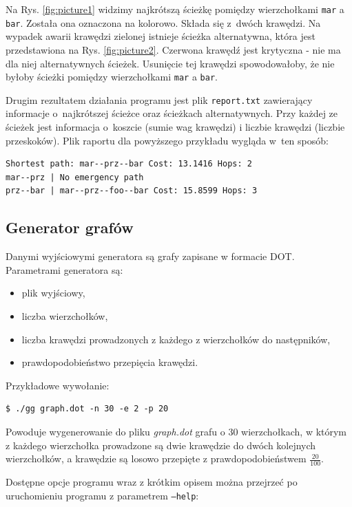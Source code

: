 \documentclass[a4paper, 12pt]{article}
\begin{document}
Na Rys. \ref{fig:picture1} widzimy najkrótszą ścieżkę pomiędzy wierzchołkami \texttt{mar} a \texttt{bar}. Została ona oznaczona na kolorowo. Składa się z~dwóch krawędzi. Na wypadek awarii krawędzi zielonej istnieje ścieżka alternatywna, która jest przedstawiona na Rys. \ref{fig:picture2}. Czerwona krawędź jest krytyczna - nie ma dla niej alternatywnych ścieżek. Usunięcie tej krawędzi spowodowałoby, że nie byłoby ścieżki pomiędzy wierzchołkami \texttt{mar} a \texttt{bar}.

Drugim rezultatem działania programu jest plik \texttt{report.txt} zawierający informacje o~najkrótszej ścieżce oraz ścieżkach alternatywnych. Przy każdej ze ścieżek jest informacja o~koszcie (sumie wag krawędzi) i liczbie krawędzi (liczbie przeskoków). Plik raportu dla powyższego przykładu wygląda w~ten sposób:

\begin{verbatim}
Shortest path: mar--prz--bar Cost: 13.1416 Hops: 2
mar--prz | No emergency path
prz--bar | mar--prz--foo--bar Cost: 15.8599 Hops: 3
\end{verbatim}

\subsection{Generator grafów}

Danymi wyjściowymi generatora są grafy zapisane w formacie DOT. Parametrami generatora są:

\begin{itemize}
\item plik wyjściowy,
\item liczba wierzchołków,
\item liczba krawędzi prowadzonych z każdego z wierzchołków do następników,
\item prawdopodobieństwo przepięcia krawędzi.
\end{itemize}

Przykładowe wywołanie:

\begin{verbatim}
$ ./gg graph.dot -n 30 -e 2 -p 20
\end{verbatim}

Powoduje wygenerowanie do pliku {\it graph.dot} grafu o $30$ wierzchołkach, w którym z każdego wierzchołka prowadzone są dwie krawędzie do dwóch kolejnych wierzchołków, a krawędzie są losowo przepięte z prawdopodobieństwem $\frac{20}{100}$.

Dostępne opcje programu wraz z krótkim opisem można przejrzeć po uruchomieniu programu z parametrem \texttt{--help}:
\end{document}
